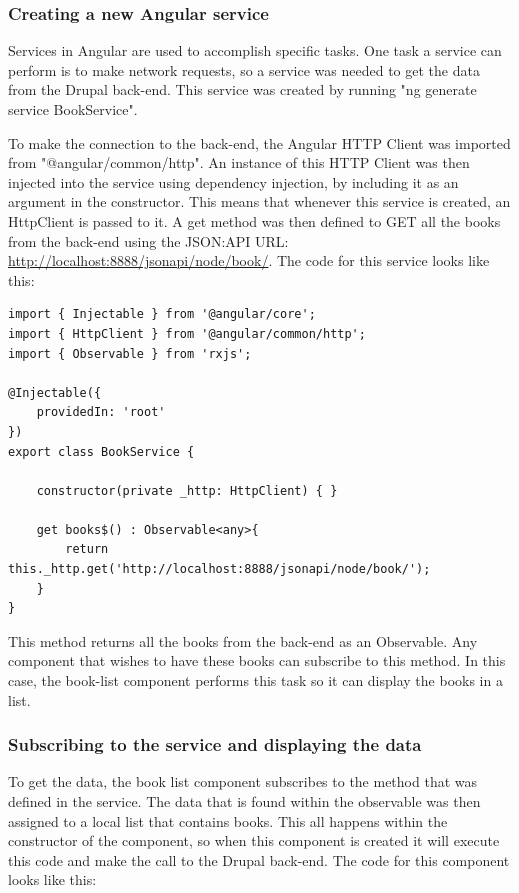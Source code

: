 \subsubsection{Creating a new Angular service}

Services in Angular are used to accomplish specific tasks. One task a service can perform is to make network requests, so a service was needed to get the data from the Drupal back-end. This service was created by running "ng generate service BookService".

To make the connection to the back-end, the Angular HTTP Client was imported from "@angular/common/http". An instance of this HTTP Client was then injected into the service using dependency injection, by including it as an argument in the constructor. This means that whenever this service is created, an HttpClient is passed to it. A get method was then defined to GET all the books from the back-end using the JSON:API URL: \url{http://localhost:8888/jsonapi/node/book/}. The code for this service looks like this: 


\begin{lstlisting}
import { Injectable } from '@angular/core';
import { HttpClient } from '@angular/common/http';
import { Observable } from 'rxjs';
	
@Injectable({
	providedIn: 'root'
})
export class BookService {
		
	constructor(private _http: HttpClient) { }
		
	get books$() : Observable<any>{
		return this._http.get('http://localhost:8888/jsonapi/node/book/');
	}
}
\end{lstlisting}

This method returns all the books from the back-end as an Observable. Any component that wishes to have these books can subscribe to this method. In this case, the book-list component performs this task so it can display the books in a list.

\subsubsection{Subscribing to the service and displaying the data}

To get the data, the book list component subscribes to the method that was defined in the service. The data that is found within the observable was then assigned to a local list that contains books. This all happens within the constructor of the component, so when this component is created it will execute this code and make the call to the Drupal back-end. The code for this component looks like this:

